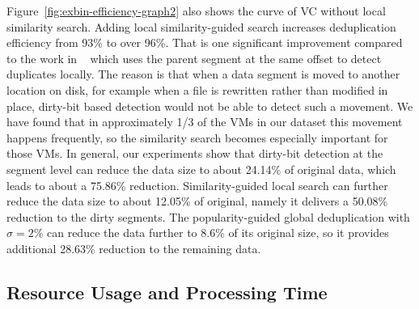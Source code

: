 Figure~\ref{fig:exbin-efficiency-graph2} also shows the curve  of VC without local similarity search.
Adding local similarity-guided search increases deduplication efficiency from 93\% to over 96\%.
That is one significant improvement compared to the work in ~\cite{WeiZhangIEEE}
which uses the parent segment at the same offset to detect duplicates locally.
The reason is that  
when a data  segment is moved to another location on disk, for example when a file is rewritten
rather than modified in place,  dirty-bit based detection would not be able to detect such a movement.
 We have found that in
approximately 1/3 of the VMs in our dataset this movement happens frequently,
so the similarity search becomes especially important for those VMs.
In general, our experiments show that
dirty-bit detection at the segment level can reduce the data size to about 24.14\% of original data, 
which leads to about a 75.86\% reduction.
Similarity-guided local search can further reduce the data size
to about 12.05\% of original, namely it delivers a 50.08\% reduction to the dirty segments.
The popularity-guided global deduplication with $\sigma=2\% $
can reduce the data further to 8.6\% of its original size, so
it provides additional 28.63\% reduction to the remaining data.


\subsection{Resource Usage and Processing Time}


